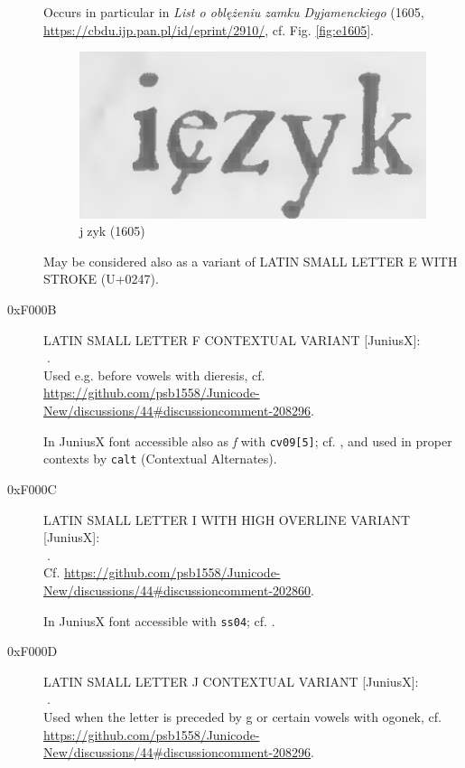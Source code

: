 \documentclass{article}
\newcommand{\Jglyph}[1]{{\relsize{2}\J#1}}
\begin{document}
\begin{description}
 Occurs in particular in \textit{List o oblężeniu zamku Dyjamenckiego} (1605,
 \url{https://cbdu.ijp.pan.pl/id/eprint/2910/},
 cf. Fig. \vref{fig:e1605}.
 
  \begin{figure}[h]
    \includegraphics[width=1\hsize]{img/00436649jezyk}
    \caption{\J j󰀊zyk (1605)}
    \label{fig:e1605}
  \end{figure}

 May be considered also as a variant of LATIN SMALL LETTER E WITH
  STROKE (U+0247).

\item [0xF000B] LATIN SMALL LETTER F CONTEXTUAL VARIANT [JuniusX]:\\
  \Jglyph{󰀋}.\\ Used e.g. before vowels with dieresis,
  cf. \url{https://github.com/psb1558/Junicode-New/discussions/44#discussioncomment-208296}.
  
  In JuniusX font accessible also as \textit{f} with \texttt{cv09[5]};
  cf. \autocite[p. 9]{baker20:_opent_featur_junius_junius}, and used
  in proper contexts by \texttt{calt} (Contextual Alternates).
  
\item [0xF000C] LATIN SMALL LETTER I WITH HIGH OVERLINE VARIANT [JuniusX]:\\
  \Jglyph{󰀌}.\\ Cf. \url{https://github.com/psb1558/Junicode-New/discussions/44#discussioncomment-202860}.

  In JuniusX font accessible  with \texttt{ss04};
  cf. \autocite[p. 6]{baker20:_opent_featur_junius_junius}.

\item [0xF000D] LATIN SMALL LETTER J CONTEXTUAL VARIANT [JuniusX]:\\
  \Jglyph{󰀍}.\\ Used when the letter is preceded by g or certain vowels with ogonek,
  cf. \url{https://github.com/psb1558/Junicode-New/discussions/44#discussioncomment-208296}.


\end{description}
\end{document}
